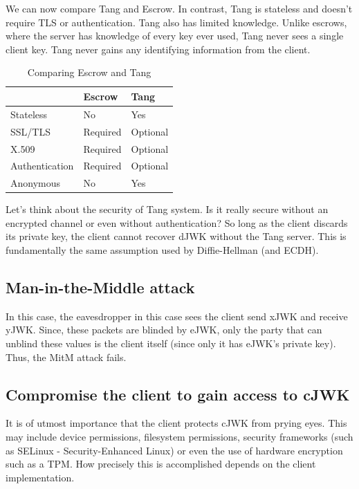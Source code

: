 \documentclass[../xdudla00-porting-Tang-to-Open-WRT.tex]{subfiles}
\begin{document}
We can now compare Tang and Escrow. In contrast, Tang is stateless and doesn't require TLS or authentication.
Tang also has limited knowledge. Unlike escrows, where the server has knowledge of every key ever used, Tang never sees a single client key.
Tang never gains any identifying information from the client.

\begin{table}[h]
\centering
\label{compare}
\begin{tabular}{@{}lll@{}}
\toprule
               & Escrow   & Tang                         \\ \midrule
Stateless      & No       & Yes                          \\
SSL/TLS        & Required & Optional                     \\
X.509          & Required & Optional                     \\
Authentication & Required & Optional                     \\
Anonymous      & No       & Yes                          \\ \bottomrule
\end{tabular}
\caption{Comparing Escrow and Tang}
\end{table}

Let's think about the security of Tang system. Is it really secure without an encrypted channel or even without authentication?
So long as the client discards its private key, the client cannot recover dJWK without the Tang server.
This is fundamentally the same assumption used by Diffie-Hellman (and ECDH).

\subsection{Man-in-the-Middle attack}
In this case, the eavesdropper in this case sees the client send xJWK and receive yJWK.
Since, these packets are blinded by eJWK, only the party that can unblind these values is the client itself (since only it has eJWK's private key).
Thus, the MitM attack fails.
\subsection{Compromise the client to gain access to cJWK}
It is of utmost importance that the client protects cJWK from prying eyes.
This may include device permissions, filesystem permissions, security frameworks (such as SELinux - Security-Enhanced Linux) or even the use of hardware encryption such as a TPM.
How precisely this is accomplished depends on the client implementation.
\end{document}
